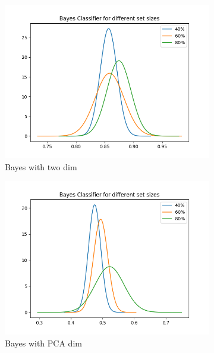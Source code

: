 \documentclass[12pt, a4paper]{article}
\begin{document}
\begin{figure}[H]
    \centering
    \begin{subfigure}{0.3\textwidth}
        \includegraphics[width=\textwidth]{recursos/1/bayes_2}
        \caption{Bayes with two dim}
    \end{subfigure}
    \begin{subfigure}{0.3\textwidth}
        \includegraphics[width=\textwidth]{recursos/1/bayes_pca}
        \caption{Bayes with PCA dim}
    \end{subfigure}
    \begin{subfigure}{0.3\textwidth}

\end{subfigure}
\end{figure}
\end{document}
